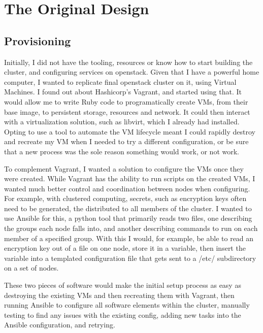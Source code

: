 \documentclass{article}
\begin{document}
\section{The Original Design}
\subsection{Provisioning}
Initially, I did not have the tooling, resources or know how to start building the cluster, and configuring services on openstack. Given that I have a powerful home computer, I wanted to replicate final openstack cluster on it, using Virtual Machines. I found out about Hashicorp's Vagrant, and started using that. It would allow me to write Ruby code to programatically create VMs, from their base image, to persistent storage, resources and network. It could then interact with a virtualization solution, such as libvirt, which I already had installed. Opting to use a tool to automate the VM lifecycle meant I could rapidly destroy and recreate my VM when I needed to try a different configuration, or be sure that a new process was the sole reason something would work, or not work.

To complement Vagrant, I wanted a solution to configure the VMs once they were created. While Vagrant has the ability to run scripts on the created VMs, I wanted much better control and coordination between nodes when configuring. For example, with clustered computing, secrets, such as encryption keys often need to be generated, the distributed to all members of the cluster. I wanted to use Ansible for this, a python tool that primarily reads two files, one describing the groups each node falls into, and another describing commands to run on each member of a specified group. With this I would, for example, be able to read an encryption key out of a file on one node, store it in a variable, then insert the variable into a templated configuration file that gets sent to a /etc/ subdirectory on a set of nodes.

These two pieces of software would make the initial setup process as easy as destroying the existing VMs and then recreating them with Vagrant, then running Ansible to configure all software elements within the cluster, manually testing to find any issues with the existing config, adding new tasks into the Ansible configuration, and retrying.
\end{document}
